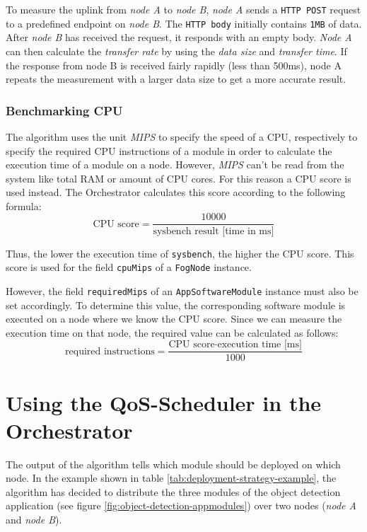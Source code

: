 To measure the uplink from \textit{node A} to \textit{node B}, \textit{node A} sends a \texttt{HTTP POST} request to a predefined endpoint on \textit{node B}. The \texttt{HTTP body} initially contains \texttt{1MB} of data. After \textit{node B} has received the request, it responds with an empty body. \textit{Node A} can then calculate the \textit{transfer rate} by using the \textit{data size} and \textit{transfer time}.
If the response from node B is received fairly rapidly (less than 500ms), node A repeats the measurement with a larger data size to get a more accurate result.

\subsubsection*{Benchmarking CPU}
The algorithm uses the unit \textit{MIPS} to specify the speed of a CPU, respectively to specify the required CPU instructions of a module in order to calculate the execution time of a module on a node. However, \textit{MIPS} can't be read from the system like total RAM or amount of CPU cores. For this reason a CPU score is used instead. The Orchestrator calculates this score according to the following formula:
\[\textrm{CPU score} = \frac{10000}{\textrm{sysbench result [time in ms]}}\]

Thus, the lower the execution time of \texttt{sysbench}, the higher the CPU score. This score is used for the field \texttt{cpuMips} of a \texttt{FogNode} instance.

However, the field \texttt{requiredMips} of an \texttt{AppSoftwareModule} instance must also be set accordingly. To determine this value, the corresponding software module is executed on a node where we know the CPU score. Since we can measure the execution time on that node, the required value can be calculated as follows:
\[\textrm{required instructions} = \frac{\textrm{CPU score} \boldsymbol{\cdot} \textrm{execution time [ms]}}{1000}\]


\section{Using the QoS-Scheduler in the Orchestrator}

The output of the algorithm tells which module should be deployed on which node. In the example shown in table \ref{tab:deployment-strategy-example}, the algorithm has decided to distribute the three modules of the object detection application (see figure \ref{fig:object-detection-appmodules}) over two nodes (\textit{node A} and \textit{node B}).

